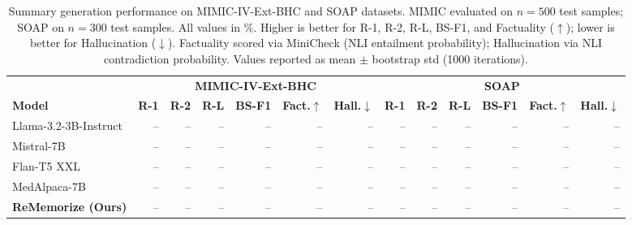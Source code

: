 \documentclass{article}
\begin{document}
\begin{table}[t]
\centering
\caption{Summary generation performance on MIMIC-IV-Ext-BHC and SOAP datasets.
MIMIC evaluated on $n{=}500$ test samples; SOAP on $n{=}300$ test samples.
All values in \%. Higher is better for R-1, R-2, R-L, BS-F1, and Factuality ($\uparrow$); lower is better for Hallucination ($\downarrow$).
Factuality scored via MiniCheck (NLI entailment probability); Hallucination via NLI contradiction probability.
Values reported as mean $\pm$ bootstrap std (1000 iterations).}
\label{tab:main_results}
\begin{tabular}{lrrrrrrrrrrrr}
\toprule
& \multicolumn{6}{c}{\textbf{MIMIC-IV-Ext-BHC}} & \multicolumn{6}{c}{\textbf{SOAP}} \\
\cmidrule(lr){2-7} \cmidrule(lr){8-13}
\textbf{Model}
& \textbf{R-1} & \textbf{R-2} & \textbf{R-L} & \textbf{BS-F1} & \textbf{Fact.}$\uparrow$ & \textbf{Hall.}$\downarrow$
& \textbf{R-1} & \textbf{R-2} & \textbf{R-L} & \textbf{BS-F1} & \textbf{Fact.}$\uparrow$ & \textbf{Hall.}$\downarrow$ \\
\midrule
Llama-3.2-3B-Instruct  & -- & -- & -- & -- & -- & -- & -- & -- & -- & -- & -- & -- \\
Mistral-7B             & -- & -- & -- & -- & -- & -- & -- & -- & -- & -- & -- & -- \\
Flan-T5 XXL            & -- & -- & -- & -- & -- & -- & -- & -- & -- & -- & -- & -- \\
MedAlpaca-7B           & -- & -- & -- & -- & -- & -- & -- & -- & -- & -- & -- & -- \\
\midrule
\textbf{ReMemorize (Ours)} & -- & -- & -- & -- & -- & -- & -- & -- & -- & -- & -- & -- \\
\bottomrule
\end{tabular}
\end{table}
\end{document}

